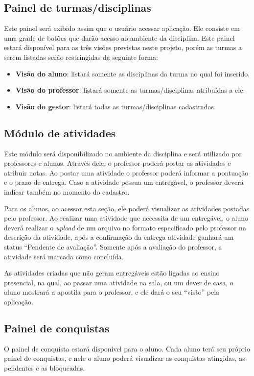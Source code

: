 \documentclass[
    12pt,               %
    openright,          %
    oneside,
    a4paper,            %
    paginasA3,  %
    MODELO,             %
    TODO,               %
    english,            %
    brazil              %
    ]{ifsp-spo-inf-ctds} %
\begin{document}
\subsection{Painel de turmas/disciplinas}
Este painel será exibido assim que o usuário acessar aplicação. Ele consiste em uma grade de botões que darão acesso ao ambiente da disciplina. Este painel estará disponível para as três visões previstas neste projeto, porém as turmas a serem listadas serão restringidas da seguinte forma:
\begin{itemize}
\item \textbf{Visão do aluno}: listará somente as disciplinas da turma no qual foi inserido.
\item \textbf{Visão do professor}: listará somente as turmas/disciplinas atribuídas a ele.
\item \textbf{Visão do gestor}: listará todas as turmas/disciplinas cadastradas.
\end{itemize}

\subsection{Módulo de atividades}
Este módulo será disponibilizado no ambiente da disciplina e será utilizado por professores e alunos. Através dele, o professor poderá postar as atividades e atribuir notas. Ao postar uma atividade o professor poderá informar a pontuação e o prazo de entrega. Caso a atividade possua um entregável, o professor deverá indicar também no momento do cadastro.

Para os alunos, ao acessar esta seção, ele poderá visualizar as atividades postadas pelo professor. Ao realizar uma atividade que necessita de um entregável, o aluno deverá realizar o \textit{upload} de um arquivo no formato especificado pelo professor na descrição da atividade, após a confirmação da entrega atividade ganhará um status “Pendente de avaliação”. Somente após a avaliação do professor, a atividade será marcada como concluída.

As atividades criadas que não geram entregáveis estão ligadas ao ensino presencial, na qual, ao passar uma atividade na sala, ou um dever de casa, o aluno mostrará a apostila para o professor, e ele dará o seu “visto” pela aplicação. 
\subsection{Painel de conquistas}
O painel de conquista estará disponível para o aluno. Cada aluno terá seu próprio painel de conquistas, e nele o aluno poderá visualizar as conquistas atingidas, as pendentes e as bloqueadas. 
\end{document}
